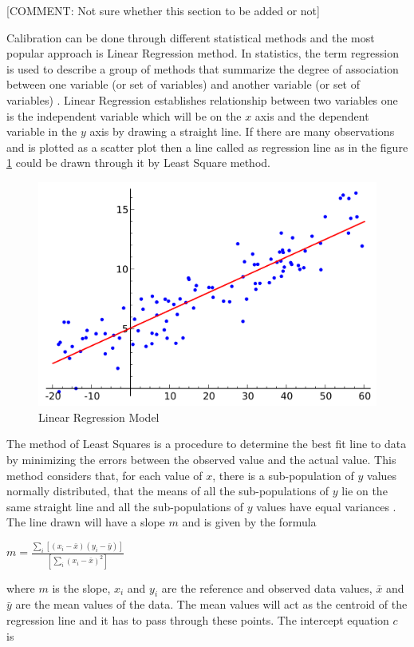 [COMMENT:  Not sure whether this section to be added or not]

Calibration can be done through different statistical methods and the most popular approach is Linear Regression method. In statistics, the term regression is used to describe a group of methods that summarize the degree of association between one variable (or set of variables) and another variable (or set of variables) \cite{Burke}. Linear Regression establishes relationship between two variables one is the independent variable which will be on the $x$ axis and the dependent variable in the $y$ axis by drawing a straight line.
If there are many observations and is plotted as a scatter plot then a line called as regression line as in the figure \ref{LRM} could be drawn through it by Least Square method. 


\begin{figure}[h]
    \begin{center}
    \includegraphics[scale=0.25]{./images/figure9.png} 
    \end{center}
    \caption{Linear Regression Model \cite{regression}}
    \label{LRM}
  \end{figure}
  The method of Least Squares is a procedure to determine the best fit line to data\cite{S.Miller1992} by minimizing the errors between the observed value and the actual value. This method considers that, for each value of $x$, there is a sub-population of $y$ values normally distributed, that the means of all the sub-populations of $y$ lie on the same straight line and all the sub-populations of $y$ values have equal variances \cite{Almeida2002} \cite{daniel2018biostatistics}.
  The line drawn will have a slope $m$ and is given by the formula
\begin{center}

    
             {\large  $ m = \frac{\sum_{i}[(x_i-\bar{x})(y_i-\bar{y})]}{[ \sum_{i}(x_i-\bar{x})^2 ]}$} \cite{Stone2001} \cite{Arsova2009} \cite{Burke}


\end{center}
where $m$ is the slope, $x_i$ and $y_i$ are the reference and observed data values, $\bar{x}$ and $\bar{y}$ are the mean values of the data. The mean values will act as the centroid of the regression line and it has to pass through these points.
The intercept equation $c$ is

